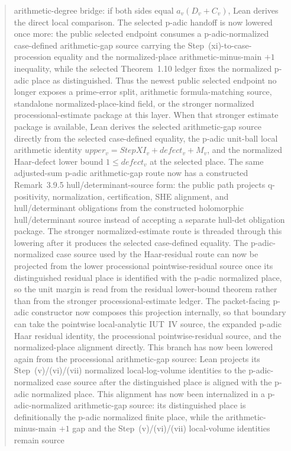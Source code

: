 \documentclass[11pt]{article}
\theoremstyle{plain}
\theoremstyle{definition}
\theoremstyle{remark}
\begin{document}
\begin{abstract}
arithmetic-degree bridge: if both sides equal \(a_v(D_v+C_v)\), Lean derives
the direct local comparison.  The selected p-adic handoff is now lowered once
more: the public selected endpoint consumes a p-adic-normalized case-defined
arithmetic-gap source carrying the Step~(xi)-to-case-procession equality and
the normalized-place arithmetic-minus-main \(+1\) inequality, while the
selected Theorem~1.10 ledger fixes the normalized p-adic place as
distinguished.  Thus the newest public selected endpoint no longer exposes a
prime-error split, arithmetic formula-matching source, standalone
normalized-place-kind field, or the stronger normalized processional-estimate
package at this layer.  When that stronger estimate package is available,
Lean derives the selected arithmetic-gap source directly from the selected
case-defined equality, the p-adic unit-ball local arithmetic identity
\(upper_v=StepXI_v+defect_v+M_v\), and the normalized Haar-defect lower bound
\(1\leq defect_v\) at the selected place.  The same adjusted-sum p-adic
arithmetic-gap route now has a constructed Remark~3.9.5
hull/determinant-source form: the public path
projects q-positivity, normalization, certification, SHE alignment, and
hull/determinant obligations from the constructed holomorphic hull/determinant
source instead of accepting a separate hull-det obligation package.
The stronger normalized-estimate route is threaded through this lowering after
it produces the selected case-defined equality.
The
p-adic-normalized case source used by the Haar-residual
route can now be projected from the lower processional pointwise-residual
source once its distinguished residual place is identified with the p-adic
normalized place, so the unit margin is read from the residual lower-bound
theorem rather than from the stronger processional-estimate ledger.  The
packet-facing p-adic constructor now composes this projection internally,
so that boundary can take the pointwise local-analytic IUT~IV source, the
expanded p-adic Haar residual identity, the processional pointwise-residual
source, and the normalized-place alignment directly.  This branch has now been
lowered again from the processional arithmetic-gap source: Lean projects its
Step~(v)/(vi)/(vii) normalized local-log-volume identities to the
p-adic-normalized case source after the distinguished place is aligned with
the p-adic normalized place.  This alignment has now been internalized in a
p-adic-normalized arithmetic-gap source: its distinguished place is
definitionally the p-adic normalized finite place, while the arithmetic-minus-main
\(+1\) gap and the Step~(v)/(vi)/(vii) local-volume identities remain source

\end{abstract}
\end{document}
